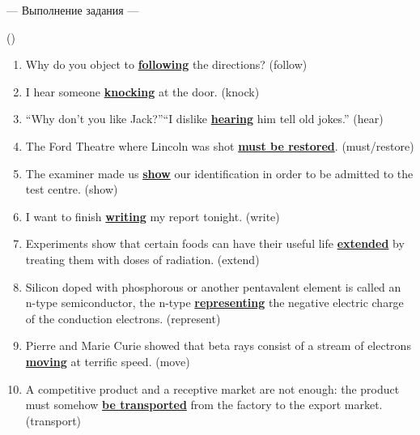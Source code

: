 \documentclass[main.tex]{subfiles}
\begin{document}
\newpage
{}

\hypertarget{ltask:2024-04-03-2}{--- Выполнение задания ---} (\hyperref[task:2024-04-03-2]{\color{blue}{перейти к тексту задания}})
\\

\vspace{5pt}
\begin{enumerate}[nosep, leftmargin=*]
	\itemsep\eitsp
	\item Why do you object to \uline{\textbf{following}} the directions? (follow)
	\item I hear someone \uline{\textbf{knocking}} at the door. (knock)
	\item ``Why don't you like Jack?''\newline ``I dislike \uline{\textbf{hearing}} him tell old jokes.'' (hear)
	\item The Ford Theatre where Lincoln was shot \uline{\textbf{must be restored}}. (must/restore)
	\item The examiner made us \uline{\textbf{show}} our identification in order to be admitted to the test centre. (show)
	\item I want to finish \uline{\textbf{writing}} my report tonight. (write)
	\item Experiments show that certain foods can have their useful life \uline{\textbf{extended}} by treating them with doses of radiation. (extend)
	\item Silicon doped with phosphorous or another pentavalent element is called an n-type semiconductor, the n-type \uline{\textbf{representing}} the negative electric charge of the conduction electrons. (represent)
	\item Pierre and Marie Curie showed that beta rays consist of a stream of electrons \uline{\textbf{moving}} at terrific speed. (move)
	\item A competitive product and a receptive market are not enough: the product must somehow \uline{\textbf{be transported}} from the factory to the export market. (transport)
\end{enumerate}
\end{document}
